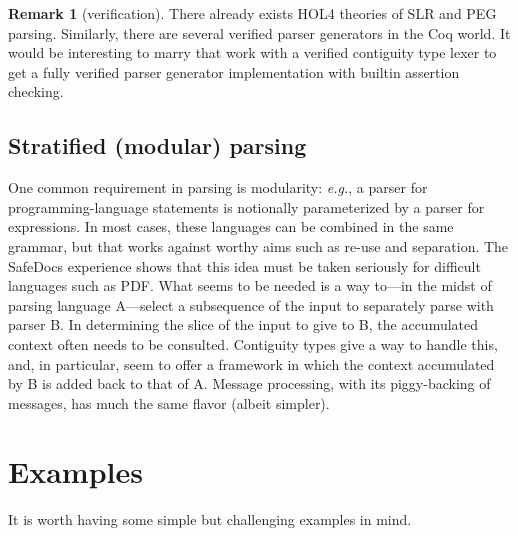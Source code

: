 \documentclass{article}
\newcommand{\eg}{\textit{e.g.}}
\theoremstyle{definition}
\newtheorem*{remark}{Remark}
\begin{document}
\begin{remark} [verification] There already exists
  HOL4 theories of SLR and PEG parsing. Similarly, there are several
  verified parser generators in the Coq world. It would be interesting
  to marry that work with a verified contiguity type lexer to get a
  fully verified parser generator implementation with builtin
  assertion checking.
\end{remark}

\subsection{Stratified (modular) parsing}

 One common requirement in parsing is modularity: \eg, a parser for
 programming-language statements is notionally parameterized by a
 parser for expressions. In most cases, these languages can be
 combined in the same grammar, but that works against worthy aims such
 as re-use and separation. The SafeDocs experience shows that this
 idea must be taken seriously for difficult languages such as
 PDF. What seems to be needed is a way to---in the midst of parsing
 language A---select a subsequence of the input to separately parse
 with parser B. In determining the slice of the input to give to B,
 the accumulated context often needs to be consulted. Contiguity types
 give a way to handle this, and, in particular, seem to offer a
 framework in which the context accumulated by B is added back to that
 of A. Message processing, with its piggy-backing of messages, has
 much the same flavor (albeit simpler).

\section{Examples}

It is worth having some simple but challenging examples in mind.
\end{document}
